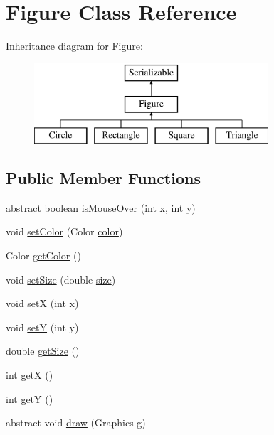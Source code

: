 \hypertarget{class_figure}{}\section{Figure Class Reference}
\label{class_figure}
Inheritance diagram for Figure\+:\begin{figure}[H]
\begin{center}
\leavevmode
\includegraphics[height=3.000000cm]{class_figure}
\end{center}
\end{figure}
\subsection*{Public Member Functions}
\begin{DoxyCompactItemize}
\item 
abstract boolean \mbox{\hyperlink{class_figure_adeb77ba46e22fad8a9bc86c10ac62221}{is\+Mouse\+Over}} (int x, int y)
\item 
void \mbox{\hyperlink{class_figure_aa4f43d4c640d16823dc2b451fbc92020}{set\+Color}} (Color \mbox{\hyperlink{class_figure_a264181e47dd7b6155b4df4a772c2fd46}{color}})
\item 
Color \mbox{\hyperlink{class_figure_a2c6e7cdb87fde8ce5f303c912e94ecba}{get\+Color}} ()
\item 
void \mbox{\hyperlink{class_figure_a559fabea6b75d3f0bcfd95aef5149823}{set\+Size}} (double \mbox{\hyperlink{class_figure_a538152f79733ae6b690797afd69aab57}{size}})
\item 
void \mbox{\hyperlink{class_figure_a7cd86e9fc5326d26fbb007f849ca5dc0}{setX}} (int x)
\item 
void \mbox{\hyperlink{class_figure_a8157494a31103df133ebf92d5f60cb0e}{setY}} (int y)
\item 
double \mbox{\hyperlink{class_figure_af7805096bd258d3d609009c6459a082b}{get\+Size}} ()
\item 
int \mbox{\hyperlink{class_figure_a0d6e3c4fdb516610efa25df8a153b7a4}{getX}} ()
\item 
int \mbox{\hyperlink{class_figure_adfd5283d53d0885b145d9c65d2f20ac3}{getY}} ()
\item 
abstract void \mbox{\hyperlink{class_figure_ab46c536e10ff5b8546963b00d2fef7b4}{draw}} (Graphics g)
\end{DoxyCompactItemize}
